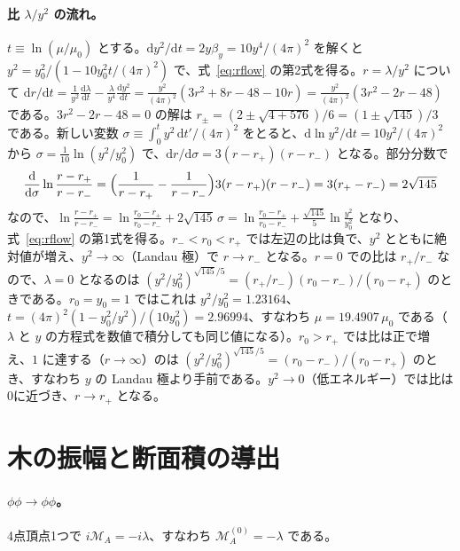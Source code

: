 \documentclass[a4paper,10pt]{ltjsarticle}
\newcommand{\dd}{\mathrm{d}}
\begin{document}
\paragraph{比 $\lambda/y^2$ の流れ。}$t\equiv\ln(\mu/\mu_0)$ とする。$\dd y^2/\dd t=2y\beta_y=10y^4/(4\pi)^2$ を解くと $y^2=y_0^2/(1-10y_0^2t/(4\pi)^2)$ で、式~\eqref{eq:rflow} の第2式を得る。$r=\lambda/y^2$ について $\dd r/\dd t=\frac{1}{y^2}\frac{\dd\lambda}{\dd t}-\frac{\lambda}{y^4}\frac{\dd y^2}{\dd t}=\frac{y^2}{(4\pi)^2}(3r^2+8r-48-10r)=\frac{y^2}{(4\pi)^2}(3r^2-2r-48)$ である。$3r^2-2r-48=0$ の解は $r_\pm=(2\pm\sqrt{4+576})/6=(1\pm\sqrt{145})/3$ である。新しい変数 $\sigma\equiv\int_0^t y^2\,\dd t'/(4\pi)^2$ をとると、$\dd\ln y^2/\dd t=10y^2/(4\pi)^2$ から $\sigma=\frac{1}{10}\ln(y^2/y_0^2)$ で、$\dd r/\dd\sigma=3(r-r_+)(r-r_-)$ となる。部分分数で
\begin{equation*}
\frac{\dd}{\dd\sigma}\ln\frac{r-r_+}{r-r_-}=\Bigl(\frac{1}{r-r_+}-\frac{1}{r-r_-}\Bigr)3(r-r_+)(r-r_-)=3(r_+-r_-)=2\sqrt{145}
\end{equation*}
なので、$\ln\frac{r-r_+}{r-r_-}=\ln\frac{r_0-r_+}{r_0-r_-}+2\sqrt{145}\,\sigma=\ln\frac{r_0-r_+}{r_0-r_-}+\frac{\sqrt{145}}{5}\ln\frac{y^2}{y_0^2}$ となり、式~\eqref{eq:rflow} の第1式を得る。$r_-<r_0<r_+$ では左辺の比は負で、$y^2$ とともに絶対値が増え、$y^2\to\infty$（Landau 極）で $r\to r_-$ となる。$r=0$ での比は $r_+/r_-$ なので、$\lambda=0$ となるのは $(y^2/y_0^2)^{\sqrt{145}/5}=(r_+/r_-)(r_0-r_-)/(r_0-r_+)$ のときである。$r_0=y_0=1$ ではこれは $y^2/y_0^2=1.23164$、$t=(4\pi)^2(1-y_0^2/y^2)/(10y_0^2)=2.96994$、すなわち $\mu=19.4907\,\mu_0$ である（$\lambda$ と $y$ の方程式を数値で積分しても同じ値になる）。$r_0>r_+$ では比は正で増え、$1$ に達する（$r\to\infty$）のは $(y^2/y_0^2)^{\sqrt{145}/5}=(r_0-r_-)/(r_0-r_+)$ のとき、すなわち $y$ の Landau 極より手前である。$y^2\to0$（低エネルギー）では比は0に近づき、$r\to r_+$ となる。

\section{木の振幅と断面積の導出}\label{app:tree}

\paragraph{$\phi\phi\to\phi\phi$。}4点頂点1つで $i\mathcal M_A=-i\lambda$、すなわち $\mathcal M_A^{(0)}=-\lambda$ である。
\end{document}
